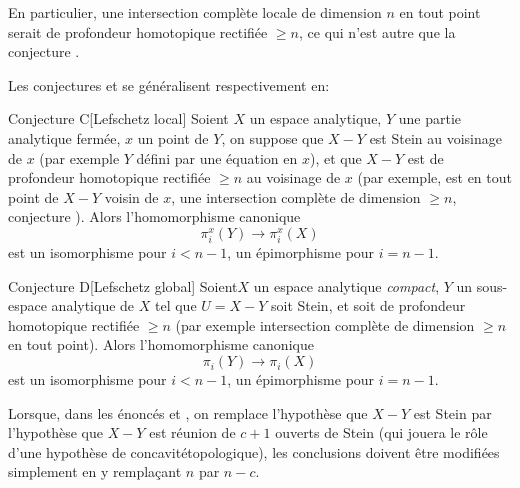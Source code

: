 En particulier, une intersection compl\`ete locale de dimension $n$ en tout point serait de profondeur homotopique rectifi\'ee $\geq n$, ce qui n'est autre que la conjecture .

Les conjectures  et  se g\'en\'eralisent respectivement en:

 \label{XIII.6.C}
\begin{enonce*}{Conjecture C}[\og Lefschetz local{\fg}\ndemark]
Soient $X$ un espace analytique, $Y$ une partie analytique ferm\'ee, $x$ un point de $Y$, on suppose que $X-Y$ est Stein au voisinage de $x$ (par exemple $Y$ d\'efini par une \'equation en $x$), et que $X-Y$ est de profondeur homotopique rectifi\'ee $\geq n$ au voisinage de $x$ (par exemple, est en tout point de $X-Y$ voisin de $x$, une intersection compl\`ete de dimension $\geq n$, \cf conjecture ). Alors l'homomorphisme canonique
$$
\pi_i^x(Y)\to\pi_i^x(X)$$
est un isomorphisme pour $i<n-1$, un \'epimorphisme pour $i=n-1$.
\end{enonce*}

 \label{XIII.6.D}
\begin{enonce*}{Conjecture D}[\og Lefschetz global{\fg}\ndemark]
Soient\pageoriginaled $X$ un espace analytique \emph{compact}, $Y$ un sous-espace analytique de $X$ tel que $U=X-Y$ soit Stein, et soit de profondeur homotopique rectifi\'ee $\geq n$ (par exemple intersection compl\`ete de dimension $\geq n$ en tout point). Alors l'homomorphisme canonique
$$
\pi_i(Y)\to\pi_i(X)$$
est un isomorphisme pour $i<n-1$, un \'epimorphisme pour $i=n-1$.
\end{enonce*}

\begin{remarquestar}
Lorsque, dans les \'enonc\'es  et , on
remplace l'hypoth\`ese que $X-Y$ est Stein par l'hypoth\`ese que
$X-Y$ est r\'eunion de $c+1$ ouverts de Stein (qui jouera le
r\^{o}le d'une hypoth\`ese de \og concavit\'e\fg topologique), les
conclusions doivent \^etre modifi\'ees simplement en y rempla\c cant
$n$ par $n-c$.
\end{remarquestar}

